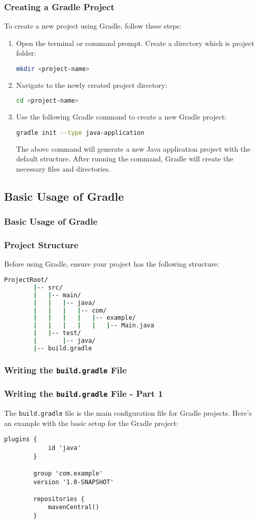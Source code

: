 \documentclass[aspectratio=169, table]{beamer}
\begin{document}
\begin{frame}[fragile]
	\vspace{20pt}
	\frametitle{Creating a Gradle Project}
	To create a new project using Gradle, follow these steps:
	\begin{enumerate}
		\item Open the terminal or command prompt. Create a directory which is project folder:
		\begin{lstlisting}[language=bash]
			mkdir <project-name>
		\end{lstlisting}
		\item Navigate to the newly created project directory:
		\begin{lstlisting}[language=bash]
			cd <project-name>
		\end{lstlisting}
		\item Use the following Gradle command to create a new Gradle project:
		\begin{lstlisting}[language=bash]
			gradle init --type java-application
		\end{lstlisting}
		The above command will generate a new Java application project with the default structure. After running the command, Gradle will create the necessary files and directories.
		
	\end{enumerate}
\end{frame}

\subsection{Basic Usage of Gradle}
\begin{frame}[fragile]
	\frametitle{Basic Usage of Gradle}
	\subsubsection{Project Structure}
	Before using Gradle, ensure your project has the following structure:
	\begin{lstlisting}[language=bash]
		ProjectRoot/
		|-- src/
		|   |-- main/
		|   |   |-- java/
		|   |   |   |-- com/
		|   |   |   |   |-- example/
		|   |   |   |   |   |-- Main.java
		|   |-- test/
		|       |-- java/
		|-- build.gradle
	\end{lstlisting}
\end{frame}

\subsubsection{Writing the \texttt{build.gradle} File}
\begin{frame}[fragile]
	\frametitle{Writing the \texttt{build.gradle} File - Part 1}
	The \texttt{build.gradle} file is the main configuration file for Gradle projects. Here’s an example with the basic setup for the Gradle project:
	\begin{lstlisting}[style=XmlStyle]
		plugins {
			id 'java'
		}
		
		group 'com.example'
		version '1.0-SNAPSHOT'
		
		repositories {
			mavenCentral()
		}
	\end{lstlisting}
\end{frame}
\end{document}
